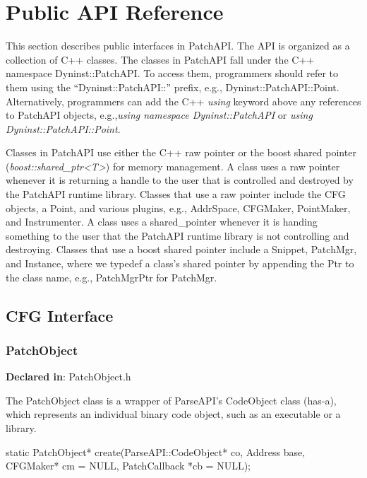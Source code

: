 \section{Public API Reference}
\label{sec-public-api}

This section describes public interfaces in PatchAPI. The API is organized as a
collection of C++ classes. The classes in PatchAPI fall under the C++ namespace
Dyninst::PatchAPI. To access them, programmers should refer to them using the
``Dyninst::PatchAPI::'' prefix, e.g., Dyninst::PatchAPI::Point. Alternatively,
programmers can add the C++ \emph{using} keyword above any references to
PatchAPI objects, e.g.,\emph{using namespace Dyninst::PatchAPI} or \emph{using
  Dyninst::PatchAPI::Point}.

Classes in PatchAPI use either the C++ raw pointer or the boost shared pointer
(\emph{boost::shared\_ptr<T>}) for memory management. A class uses a raw pointer
whenever it is returning a handle to the user that is controlled and destroyed
by the PatchAPI runtime library. Classes that use a raw pointer include the CFG
objects, a Point, and various plugins, e.g., AddrSpace, CFGMaker, PointMaker,
and Instrumenter.  A class uses a shared\_pointer whenever it is handing
something to the user that the PatchAPI runtime library is not controlling and
destroying. Classes that use a boost shared pointer include a Snippet, PatchMgr,
and Instance, where we typedef a class's shared pointer by appending the Ptr to
the class name, e.g., PatchMgrPtr for PatchMgr.

\subsection{CFG Interface}

\subsubsection{PatchObject}
\label{sec-3.2.8}

\textbf{Declared in}: PatchObject.h

The PatchObject class is a wrapper of ParseAPI's CodeObject class (has-a), which
represents an individual binary code object, such as an executable or a library.


\begin{apient}
static PatchObject* create(ParseAPI::CodeObject* co, Address base,
                           CFGMaker* cm = NULL, PatchCallback *cb = NULL);
\end{apient}


